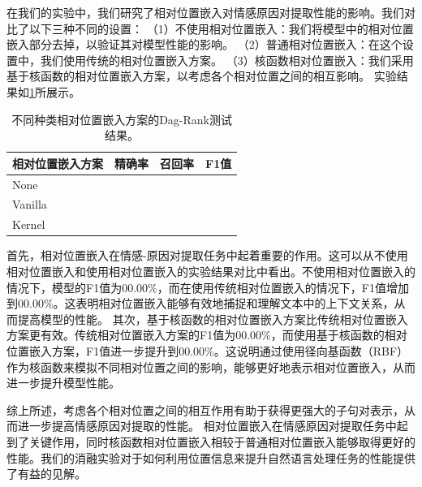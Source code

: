 
在我们的实验中，我们研究了相对位置嵌入对情感原因对提取性能的影响。我们对比了以下三种不同的设置：
（1）不使用相对位置嵌入：我们将模型中的相对位置嵌入部分去掉，以验证其对模型性能的影响。
（2）普通相对位置嵌入：在这个设置中，我们使用传统的相对位置嵌入方案。
（3）核函数相对位置嵌入：我们采用基于核函数的相对位置嵌入方案，以考虑各个相对位置之间的相互影响。
实验结果如\ref{tab:embedding}所展示。


\begin{table}[h]
   \vspace{8pt}
   \renewcommand{\arraystretch}{1.2}
   \centering\wuhao
	\caption{不同种类相对位置嵌入方案的Dag-Rank测试结果。}
	\label{tab:embedding}
   \vspace{4mm}
    
    \begin{tabularx}{\textwidth} { 
      >{\centering\arraybackslash}X 
      >{\centering\arraybackslash}X
      >{\centering\arraybackslash}X
      >{\centering\arraybackslash}X 
   }

\toprule[1.5pt]
\textbf{相对位置嵌入方案}             & 精确率 & 召回率 & F1值 \\ \midrule[1pt]
None     &  &  &     \\
Vanilla    &  &  &    \\
Kernel     &  &  &    \\ \bottomrule
\end{tabularx}
\vspace{10pt}
\end{table}


首先，相对位置嵌入在情感-原因对提取任务中起着重要的作用。这可以从不使用相对位置嵌入和使用相对位置嵌入的实验结果对比中看出。不使用相对位置嵌入的情况下，模型的F1值为$00.00\%$，而在使用传统相对位置嵌入的情况下，F1值增加到$00.00\%$。这表明相对位置嵌入能够有效地捕捉和理解文本中的上下文关系，从而提高模型的性能。
其次，基于核函数的相对位置嵌入方案比传统相对位置嵌入方案更有效。传统相对位置嵌入方案的F1值为$00.00\%$，而使用基于核函数的相对位置嵌入方案，F1值进一步提升到$00.00\%$。这说明通过使用径向基函数（RBF）作为核函数来模拟不同相对位置之间的影响，能够更好地表示相对位置嵌入，从而进一步提升模型性能。

综上所述，考虑各个相对位置之间的相互作用有助于获得更强大的子句对表示，从而进一步提高情感原因对提取的性能。
相对位置嵌入在情感原因对提取任务中起到了关键作用，同时核函数相对位置嵌入相较于普通相对位置嵌入能够取得更好的性能。我们的消融实验对于如何利用位置信息来提升自然语言处理任务的性能提供了有益的见解。


